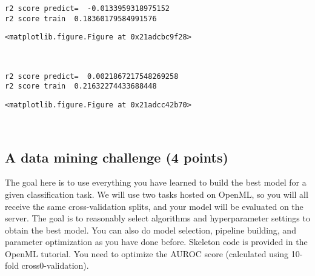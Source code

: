 \documentclass[11pt]{article}
\begin{document}
    \begin{Verbatim}[commandchars=\\\{\}]
r2 score predict=  -0.0133959318975152
r2 score train  0.18360179584991576

    \end{Verbatim}

    
    \begin{verbatim}
<matplotlib.figure.Figure at 0x21adcbc9f28>
    \end{verbatim}

    
    \begin{center}
    \end{center}
    { \hspace*{\fill} \\}
    
    \begin{Verbatim}[commandchars=\\\{\}]
r2 score predict=  0.0021867217548269258
r2 score train  0.21632274433688448

    \end{Verbatim}

    
    \begin{verbatim}
<matplotlib.figure.Figure at 0x21adcc42b70>
    \end{verbatim}

    
    \begin{center}
    \end{center}
    { \hspace*{\fill} \\}
    
    \subsection{A data mining challenge (4
points)}\label{a-data-mining-challenge-4-points}

    The goal here is to use everything you have learned to build the best
model for a given classification task. We will use two tasks hosted on
OpenML, so you will all receive the same cross-validation splits, and
your model will be evaluated on the server. The goal is to reasonably
select algorithms and hyperparameter settings to obtain the best model.
You can also do model selection, pipeline building, and parameter
optimization as you have done before. Skeleton code is provided in the
OpenML tutorial. You need to optimize the AUROC score (calculated using
10-fold cross0-validation).
\end{document}
